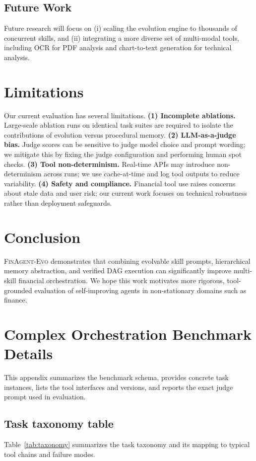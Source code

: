 \documentclass{article}
\begin{document}
\subsection{Future Work}
Future research will focus on (i) scaling the evolution engine to thousands of concurrent skills, and (ii) integrating a more diverse set of multi-modal tools, including OCR for PDF analysis and chart-to-text generation for technical analysis.

\section{Limitations}
Our current evaluation has several limitations.
\textbf{(1) Incomplete ablations.} Large-scale ablation runs on identical task suites are required to isolate the contributions of evolution versus procedural memory.
\textbf{(2) LLM-as-a-judge bias.} Judge scores can be sensitive to judge model choice and prompt wording; we mitigate this by fixing the judge configuration and performing human spot checks.
\textbf{(3) Tool non-determinism.} Real-time APIs may introduce non-determinism across runs; we use cache-at-time and log tool outputs to reduce variability.
\textbf{(4) Safety and compliance.} Financial tool use raises concerns about stale data and user risk; our current work focuses on technical robustness rather than deployment safeguards.

\section{Conclusion}
\textsc{FinAgent-Evo} demonstrates that combining evolvable skill prompts, hierarchical memory abstraction, and verified DAG execution can significantly improve multi-skill financial orchestration. We hope this work motivates more rigorous, tool-grounded evaluation of self-improving agents in non-stationary domains such as finance.

\appendix
\section{Complex Orchestration Benchmark Details}
This appendix summarizes the benchmark schema, provides concrete task instances, lists the tool interfaces and versions, and reports the exact judge prompt used in evaluation.

\subsection{Task taxonomy table}
Table~\ref{tab:taxonomy} summarizes the task taxonomy and its mapping to typical tool chains and failure modes.
\end{document}
